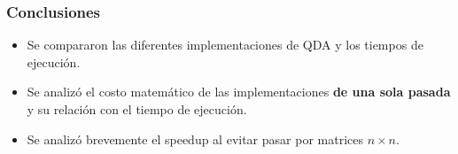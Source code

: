 \begin{frame}[fragile]
    \frametitle{Conclusiones}

    \begin{itemize}
        \item[$\blacktriangleright$] Se compararon las diferentes implementaciones de QDA y los tiempos de ejecución.
        \item[$\blacktriangleright$] Se analizó el costo matemático de las implementaciones \textbf{de una sola pasada} y su relación con el tiempo de ejecución.
        \item[$\blacktriangleright$] Se analizó brevemente el speedup al evitar pasar por matrices \(n \times n\).

    \end{itemize}

\end{frame}
